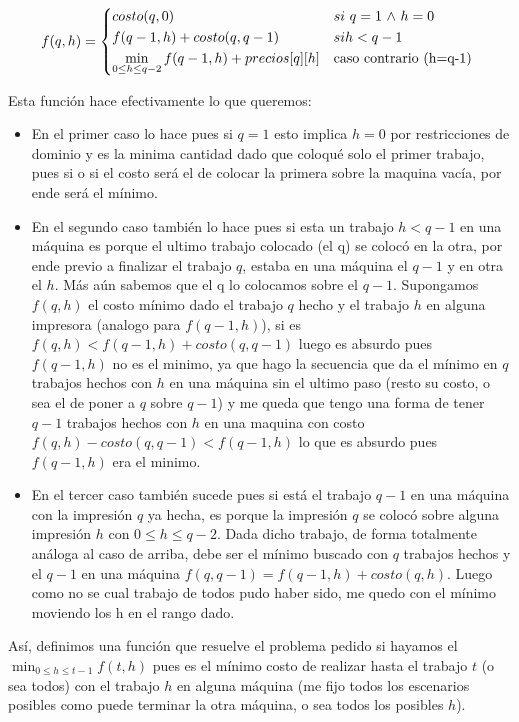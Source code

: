 \documentclass[A4paper,oneside,fleqn,11pt]{article}
\theoremstyle{definition}
\begin{document}
\begin{equation}
    f(q,h) =
    \begin{cases*}
       costo(q,0) & $si$  $q=1$  $\land$  $h=0 $\\
       f(q-1,h)+costo(q,q-1) & $si  h < q-1 $\\
       \displaystyle \min_{0 \leq h \leq q-2} {f(q-1,h)+precios[q][h]}       & caso contrario (h=q-1)
    \end{cases*}
  \end{equation}

Esta función hace efectivamente lo que queremos:
\begin{itemize}

 \item En el primer caso lo hace pues si $q=1$ esto implica $h=0$ por restricciones de dominio y es la minima cantidad dado que coloqué solo el primer trabajo, pues si o si el costo será el de colocar la primera sobre la maquina vacía, por ende será el mínimo.
 \item En el segundo caso también lo hace pues si esta un trabajo $h<q-1$ en una máquina es porque el ultimo trabajo colocado (el q) se colocó en la otra, por ende previo a finalizar el trabajo $q$, estaba en una máquina el $q-1$ y en otra el $h$. Más aún sabemos que el q lo colocamos sobre el $q-1$. Supongamos $f(q,h)$ el costo mínimo dado el trabajo $q$ hecho y el trabajo $h$ en alguna impresora (analogo para $f(q-1,h)$), si es $f(q,h)<f(q-1,h)+costo(q,q-1)$ luego es absurdo pues $f(q-1,h)$ no es el minimo, ya que hago la secuencia que da el mínimo en $q$ trabajos hechos con $h$ en una máquina sin el ultimo paso (resto su costo, o sea el de poner a $q$ sobre $q-1$) y me queda que tengo una forma de tener $q-1$ trabajos hechos con $h$ en una maquina con costo $f(q,h)-costo(q,q-1)<f(q-1,h)$ lo que es absurdo pues $f(q-1,h)$ era el minimo.
 \item En el tercer caso también sucede pues si está el trabajo $q-1$ en una máquina con la impresión $q$ ya hecha, es porque la impresión $q$ se colocó sobre alguna impresión $h$ con $0 \leq h \leq q-2$. Dada dicho trabajo, de forma totalmente análoga al caso de arriba, debe ser el mínimo buscado con $q$ trabajos hechos y el $q-1$ en una máquina $f(q,q-1)= f(q-1,h)+costo(q,h)$. Luego como no se cual trabajo de todos pudo haber sido, me quedo con el mínimo moviendo los h en el rango dado.
  \end{itemize}
Así, definimos una función que resuelve el problema pedido si hayamos el $\displaystyle \min_{0 \leq h \leq t-1} {f(t,h)}  $ pues es el mínimo costo de realizar hasta el trabajo $t$ (o sea todos) con el trabajo $h$ en alguna máquina (me fijo todos los escenarios posibles como puede terminar la otra máquina, o sea todos los posibles $h$). 
\end{document}
